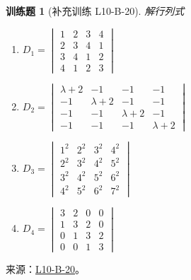 \documentclass[UTF8,12pt,a4paper,fontset=fandol]{ctexart}
\newtheorem{exercise}{训练题}[section]
\begin{document}
\begin{exercise}[补充训练 L10-B-20]\label{prob:L10-B-20}
解行列式
        \begin{enumerate} 
                \item $ D_1=\begin{vmatrix}
                        1 & 2 & 3 & 4 \\2&3&4&1\\3&4&1&2\\4&1&2&3
                    \end{vmatrix} $

                \item $ D_2=\begin{vmatrix}
                        \lambda+2 & -1        & -1        & -1        \\
                        -1        & \lambda+2 & -1        & -1        \\
                        -1        & -1        & \lambda+2 & -1        \\
                        -1        & -1        & -1        & \lambda+2
                    \end{vmatrix} $

              

                \item $ D_3=\begin{vmatrix}
                        1^{2} & 2^{2} & 3^{2} & 4^{2} \\
                        2^{2} & 3^{2} & 4^{2} & 5^{2} \\
                        3^{2} & 4^{2} & 5^{2} & 6^{2} \\
                        4^{2} & 5^{2} & 6^{2} & 7^{2}
                    \end{vmatrix} $

                \item $ D_4=\begin{vmatrix}
                        3 & 2 & 0 & 0 \\
                        1 & 3 & 2 & 0 \\
                        0 & 1 & 3 & 2 \\
                        0 & 0 & 1 & 3
                    \end{vmatrix} $
             \end{enumerate}
\end{exercise}
\noindent 来源：\href{https://github.com/yhwu-is/Linear-Algebra-Left-Undone/blob/new/%E8%AE%B2%E4%B9%89/%E4%B8%93%E9%A2%98/10%20%E8%A1%8C%E5%88%97%E5%BC%8F.tex}{L10-B-20}。
\end{document}
